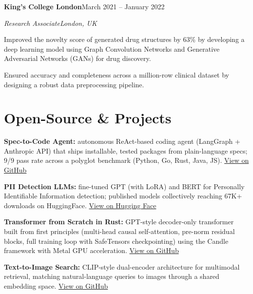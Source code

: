 \documentclass[10pt,a4paper]{article}
\newcommand{\entry}[4]{%
  {\color{company}\bfseries #1}\hfill {\color{muted}#2}\par
  \vspace{1pt}
  {\itshape #3}\hfill {\color{muted}\itshape #4}\par
  \vspace{3pt}%
}
\begin{document}
\entry{King's College London}{March 2021 -- January 2022}{Research Associate}{London, UK}
\begin{tight}
  \item Improved the novelty score of generated drug structures by 63\% by developing a deep learning model using Graph Convolution Networks and Generative Adversarial Networks (GANs) for drug discovery.
  \item Ensured accuracy and completeness across a million-row clinical dataset by designing a robust data preprocessing pipeline.
\end{tight}

\section{Open-Source \& Projects}
\begin{tight}
  \item \textbf{Spec-to-Code Agent:} autonomous ReAct-based coding agent (LangGraph + Anthropic API) that ships installable, tested packages from plain-language specs; 9/9 pass rate across a polyglot benchmark (Python, Go, Rust, Java, JS). \href{https://github.com/abhijeetscode/Spec-to-Code-Agent}{View on GitHub}
  \item \textbf{PII Detection LLMs:} fine-tuned GPT (with LoRA) and BERT for Personally Identifiable Information detection; published models collectively reaching 67K+ downloads on HuggingFace. \href{https://huggingface.co/ab-ai/pii_model}{View on Hugging Face}
  \item \textbf{Transformer from Scratch in Rust:} GPT-style decoder-only transformer built from first principles (multi-head causal self-attention, pre-norm residual blocks, full training loop with SafeTensors checkpointing) using the Candle framework with Metal GPU acceleration. \href{https://github.com/abhijeetscode/transformer-rust}{View on GitHub}
  \item \textbf{Text-to-Image Search:} CLIP-style dual-encoder architecture for multimodal retrieval, matching natural-language queries to images through a shared embedding space. \href{https://github.com/abhijeetscode/text-to-image-search}{View on GitHub}
\end{tight}

\end{document}
